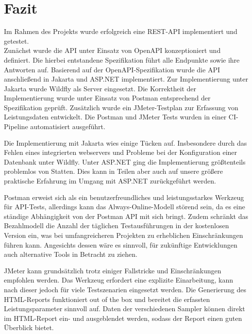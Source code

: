 \chapter{Fazit}

Im Rahmen des Projekts wurde erfolgreich eine REST-API implementiert und getestet.\\


Zunächst wurde die API unter Einsatz von OpenAPI konzeptioniert und definiert.
Die hierbei entstandene Spezifikation führt alle Endpunkte sowie ihre Antworten auf.
Basierend auf der OpenAPI-Spezifikation wurde die API anschließend in Jakarta und ASP.NET implementiert.
Zur Implementierung unter Jakarta wurde Wildfly als Server eingesetzt.
Die Korrektheit der Implementierung wurde unter Einsatz von Postman entsprechend der Spezifikation geprüft.
Zusätzlich wurde ein JMeter-Testplan zur Erfassung von Leistungsdaten entwickelt.
Die Postman und JMeter Tests wurden in einer CI-Pipeline automatisiert ausgeführt.

Die Implementierung mit Jakarta wies einige Tücken auf.
Insbesondere durch das Fehlen eines integrierten webservers
und Probleme bei der Konfiguration einer Datenbank unter Wildfly.
Unter ASP.NET ging die Implementierung größtenteils problemlos von Statten.
Dies kann in Teilen aber auch auf unsere größere praktische Erfahrung im Umgang mit ASP.NET zurückgeführt werden.

Postman erweist sich als ein benutzerfreundliches und leistungsstarkes Werkzeug für API-Tests,
allerdings kann das Always-Online-Modell störend sein, da es eine ständige Abhängigkeit von der Postman API mit sich bringt.
Zudem schränkt das Bezahlmodell die Anzahl der täglichen Testausführungen in der kostenlosen Version ein,
was bei umfangreicheren Projekten zu erheblichen Einschränkungen führen kann. 
Angesichts dessen wäre es sinnvoll, 
für zukünftige Entwicklungen auch alternative Tools in Betracht zu ziehen. 

JMeter kann grundsätzlich trotz einiger Fallstricke und Einschränkungen empfohlen werden.
Das Werkzeug erfordert eine explizite Einarbeitung,
kann nach dieser jedoch für viele Testszenarien eingesetzt werden.
Die Generierung des HTML-Reports funktioniert out of the box
und bereitet die erfassten Leistungsparameter sinnvoll auf.
Daten der verschiedenen Sampler können direkt im HTML-Report ein- und ausgeblendet werden,
sodass der Report einen guten Überblick bietet.
